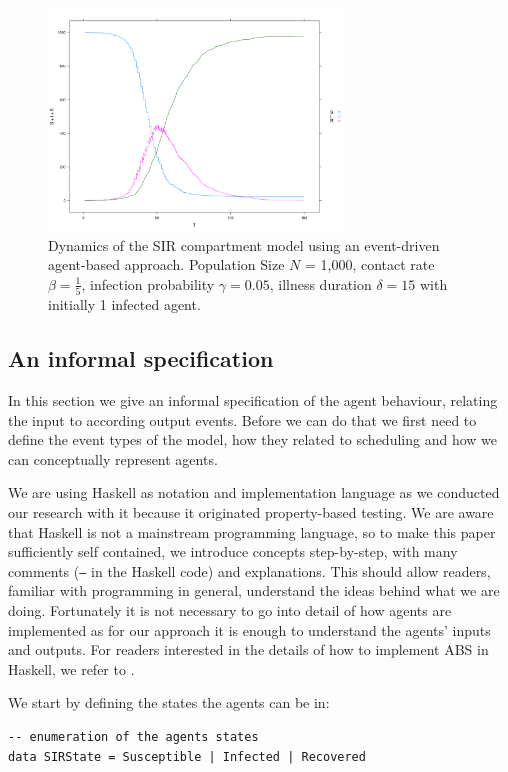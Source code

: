 \begin{figure}
	\centering
	\includegraphics[width=0.7\textwidth, angle=0]{./fig2.png}
	\caption{Dynamics of the SIR compartment model using an event-driven agent-based approach. Population Size $N$ = 1,000, contact rate $\beta =  \frac{1}{5}$, infection probability $\gamma = 0.05$, illness duration $\delta = 15$ with initially 1 infected agent.}
	\label{fig:sir_sd_dynamics}
\end{figure}

\subsection{An informal specification}
In this section we give an informal specification of the agent behaviour, relating the input to according output events. Before we can do that we first need to define the event types of the model, how they related to scheduling and how we can conceptually represent agents.

We are using Haskell as notation and implementation language as we conducted our research with it because it originated property-based testing. We are aware that Haskell is not a mainstream programming language, so to make this paper sufficiently self contained, we introduce concepts step-by-step, with many comments (\texttt{--} in the Haskell code) and explanations. This should allow readers, familiar with programming in general, understand the ideas behind what we are doing. Fortunately it is not necessary to go into detail of how agents are implemented as for our approach it is enough to understand the agents' inputs and outputs. For readers interested in the details of how to implement ABS in Haskell, we refer to \cite{thaler_pure_2018}.

We start by defining the states the agents can be in:

\begin{footnotesize}
\begin{verbatim}
-- enumeration of the agents states
data SIRState = Susceptible | Infected | Recovered
\end{verbatim}
\end{footnotesize}

